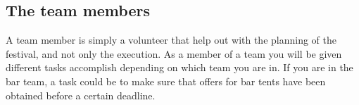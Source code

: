 \subsection{The team members}
\label{sub:team_members}
A team member is simply a volunteer that help out with the planning of the festival, and not only
the execution. As a member of a team you will be given different tasks accomplish depending on which
team you are in. If you are in the bar team, a task could be to make sure that offers for bar tents
have been obtained before a certain deadline. 

